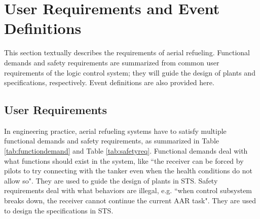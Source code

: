 \section{User Requirements and Event Definitions}
\label{sec:req}
This section textually describes the requirements of aerial refueling. Functional demands and safety requirements are summarized from common user requirements of the logic control system; they will guide the design of plants and specifications, respectively. Event definitions are also provided here.

\subsection{User Requirements}
In engineering practice, aerial refueling systems have to satisfy multiple functional demands and safety requirements, as summarized in Table \ref{tab:functiondemand} and Table \ref{tab:safetyreq}. Functional demands deal with what functions should exist in the system, like ``the receiver can be forced by pilots to try connecting with the tanker even when the health conditions do not allow so". They are used to guide the design of plants in STS. Safety requirements deal with what behaviors are illegal, e.g. ``when control subsystem breaks down, the receiver cannot continue the current AAR task". They are used to design the specifications in STS. 
